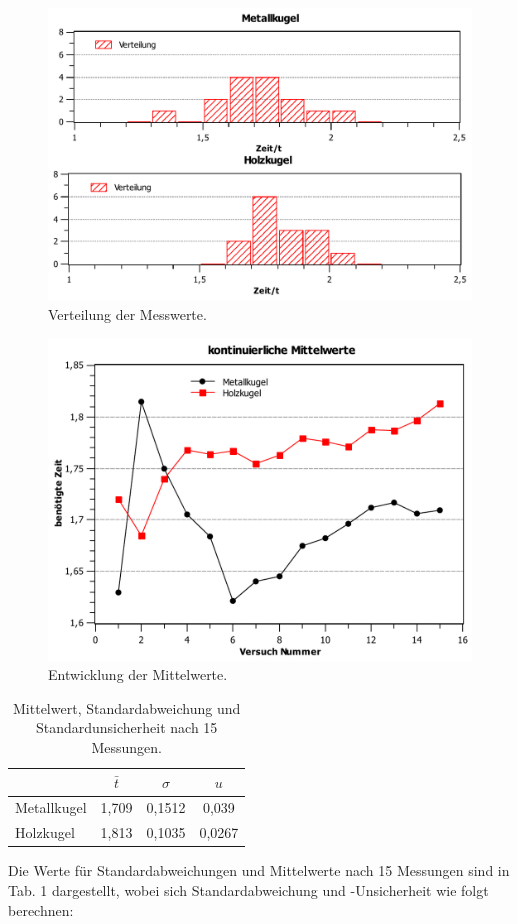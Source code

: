\documentclass[11pt,a4paper,titlepage, ngerman]{article}
\begin{document}
				\begin{figure}							
					\centering
					\includegraphics[scale=0.7]{Histogramm.pdf}
					\caption{Verteilung der Messwerte.}
					\label{HistogrammV3}							
				\end{figure}
				\begin{figure}						
						\centering
						\includegraphics[scale=0.7]{Mittelwerte.pdf}
						\caption{Entwicklung der Mittelwerte.}
						\label{MittelwerteV3}										
				\end{figure}								
				\begin{table}
					\label{Tab:VerteilungsWerte}
					\centering
					\begin{tabular}{l|SSS}
						\hline
						& {$\bar{t}$} & {$\sigma$} & {$u$} \\ \hline
						Metallkugel & 1,709 & 0,1512 & 0,039\\
						Holzkugel & 1,813 & 0,1035 & 0,0267\\ \hline
					\end{tabular}
					\caption{Mittelwert, Standardabweichung und Standardunsicherheit nach 15 Messungen.}
				\end{table}					
				Die Werte für Standardabweichungen und Mittelwerte nach 15 Messungen sind in Tab. 1 dargestellt, wobei sich Standardabweichung und -Unsicherheit wie folgt berechnen:
				
\end{document}
